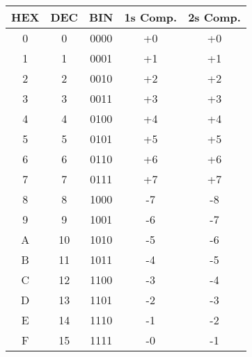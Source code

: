 \begin{tabular}{ccccc}
	\toprule
	HEX & DEC & BIN    & 1s Comp. & 2s Comp. \\
	\midrule
	{0} & 0   & {0000} & +0       & +0       \\
	{1} & 1   & {0001} & +1       & +1       \\
	{2} & 2   & {0010} & +2       & +2       \\
	{3} & 3   & {0011} & +3       & +3       \\
	{4} & 4   & {0100} & +4       & +4       \\
	{5} & 5   & {0101} & +5       & +5       \\
	{6} & 6   & {0110} & +6       & +6       \\
	{7} & 7   & {0111} & +7       & +7       \\
	{8} & 8   & {1000} & -7       & -8       \\
	{9} & 9   & {1001} & -6       & -7       \\
	{A} & 10  & {1010} & -5       & -6       \\
	{B} & 11  & {1011} & -4       & -5       \\
	{C} & 12  & {1100} & -3       & -4       \\
	{D} & 13  & {1101} & -2       & -3       \\
	{E} & 14  & {1110} & -1       & -2       \\
	{F} & 15  & {1111} & -0       & -1       \\
	\bottomrule
\end{tabular}
